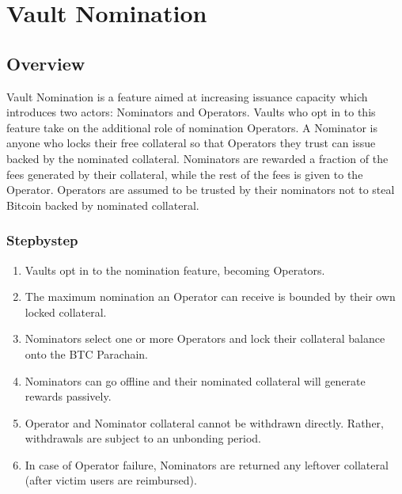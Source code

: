 \documentclass[a4paper,10pt,english]{sphinxmanual}
\begin{document}
\chapter{Vault Nomination}
\label{\detokenize{spec/nomination:vault-nomination}}\label{\detokenize{spec/nomination:id1}}\label{\detokenize{spec/nomination::doc}}

\section{Overview}
\label{\detokenize{spec/nomination:overview}}
Vault Nomination is a feature aimed at increasing  issuance capacity which introduces two actors: Nominators and Operators.
Vaults who opt in to this feature take on the additional role of nomination Operators.
A Nominator is anyone who locks their free collateral so that Operators they trust can issue  backed by the nominated collateral.
Nominators are rewarded a fraction of the fees generated by their collateral, while the rest of the fees is given to the Operator.
Operators are assumed to be trusted by their nominators not to steal Bitcoin backed by nominated collateral.


\subsection{Step\sphinxhyphen{}by\sphinxhyphen{}step}
\label{\detokenize{spec/nomination:step-by-step}}\begin{enumerate}
%
\item {} 
Vaults opt in to the nomination feature, becoming Operators.

\item {} 
The maximum nomination an Operator can receive is bounded by their own locked collateral.

\item {} 
Nominators select one or more Operators and lock their collateral balance onto the BTC Parachain.

\item {} 
Nominators can go offline and their nominated collateral will generate rewards passively.

\item {} 
Operator and Nominator collateral cannot be withdrawn directly. Rather, withdrawals are subject to an unbonding period.

\item {} 
In case of Operator failure, Nominators are returned any left\sphinxhyphen{}over collateral (after victim users are reimbursed).

\end{enumerate}
\end{document}
